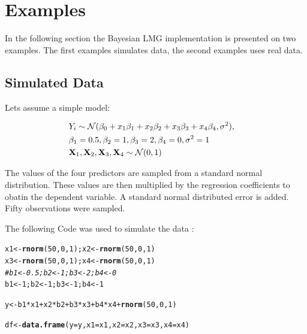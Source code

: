 \documentclass[11pt,a4paper,twoside]{book}\usepackage[]{graphicx}\usepackage[]{color}
\makeatletter
\newcommand{\hlnum}[1]{\textcolor[rgb]{0.686,0.059,0.569}{#1}}%
\newcommand{\hlcom}[1]{\textcolor[rgb]{0.678,0.584,0.686}{\textit{#1}}}%
\newcommand{\hlopt}[1]{\textcolor[rgb]{0,0,0}{#1}}%
\newcommand{\hlstd}[1]{\textcolor[rgb]{0.345,0.345,0.345}{#1}}%
\newcommand{\hlkwb}[1]{\textcolor[rgb]{0.69,0.353,0.396}{#1}}%
\newcommand{\hlkwc}[1]{\textcolor[rgb]{0.333,0.667,0.333}{#1}}%
\newcommand{\hlkwd}[1]{\textcolor[rgb]{0.737,0.353,0.396}{\textbf{#1}}}%
\newenvironment{kframe}{%
 \def\at@end@of@kframe{}%
 \ifinner\ifhmode%
  \def\at@end@of@kframe{\end{minipage}}%
  \begin{minipage}{\columnwidth}%
 \fi\fi%
 \def\FrameCommand##1{\hskip\@totalleftmargin \hskip-\fboxsep
 \colorbox{shadecolor}{##1}\hskip-\fboxsep
     \hskip-\linewidth \hskip-\@totalleftmargin \hskip\columnwidth}%
 \MakeFramed {\advance\hsize-\width
   \@totalleftmargin\z@ \linewidth\hsize
   \@setminipage}}%
 {\par\unskip\endMakeFramed%
 \at@end@of@kframe}
\newenvironment{knitrout}{}{} %
\makeatother
\begin{document}
\chapter{Examples}

In the following section the Bayesian LMG implementation is presented on two examples. The first examples simulates data, the second examples uses real data.

\section{Simulated Data}

Lets assume a simple model: 

\begin{align} 
&Y_{i} \sim \mathcal{N}(\beta_{0}+x_{1} \beta_{1}+x_{2} \beta_{2}+x_{3} \beta_{3}+x_{4} \beta_{4}, \sigma^2),& \\ & \beta_{1} = 0.5, \beta_{2} = 1,  \beta_{3} = 2 , \beta_{4}=0, \sigma^2 = 1 & \\ & {\mathbf{X}}_{1}, {\mathbf{X}}_{2},{\mathbf{X}}_{3},{\mathbf{X}}_{4} \sim \mathcal{N}(0, 1)&
\end{align} 


The values of the four predictors are sampled from a standard normal distribution. These values are then multiplied by the regression coefficients to obatin the dependent variable. A standard normal distributed error is added. Fifty observations were sampled.

The following Code was used to simulate the data :

\begin{knitrout}
\color{fgcolor}\begin{kframe}
\begin{alltt}
\hlstd{x1} \hlkwb{<-} \hlkwd{rnorm}\hlstd{(}\hlnum{50}\hlstd{,} \hlnum{0}\hlstd{,} \hlnum{1}\hlstd{); x2} \hlkwb{<-} \hlkwd{rnorm}\hlstd{(}\hlnum{50}\hlstd{,} \hlnum{0}\hlstd{,} \hlnum{1}\hlstd{)}
\hlstd{x3} \hlkwb{<-} \hlkwd{rnorm}\hlstd{(}\hlnum{50}\hlstd{,} \hlnum{0}\hlstd{,} \hlnum{1}\hlstd{); x4} \hlkwb{<-} \hlkwd{rnorm}\hlstd{(}\hlnum{50}\hlstd{,} \hlnum{0}\hlstd{,} \hlnum{1}\hlstd{)}
\hlcom{#b1 <- 0.5; b2 <- 1; b3 <- 2; b4 <- 0}
\hlstd{b1} \hlkwb{<-} \hlnum{1}\hlstd{; b2} \hlkwb{<-} \hlnum{1}\hlstd{; b3} \hlkwb{<-} \hlnum{1}\hlstd{; b4} \hlkwb{<-} \hlnum{1}

\hlstd{y} \hlkwb{<-} \hlstd{b1}\hlopt{*}\hlstd{x1} \hlopt{+} \hlstd{x2}\hlopt{*}\hlstd{b2} \hlopt{+} \hlstd{b3}\hlopt{*}\hlstd{x3} \hlopt{+} \hlstd{b4}\hlopt{*}\hlstd{x4} \hlopt{+} \hlkwd{rnorm}\hlstd{(}\hlnum{50}\hlstd{,} \hlnum{0}\hlstd{,} \hlnum{1}\hlstd{)}

\hlstd{df} \hlkwb{<-} \hlkwd{data.frame}\hlstd{(}\hlkwc{y} \hlstd{= y,} \hlkwc{x1} \hlstd{= x1,} \hlkwc{x2} \hlstd{= x2,} \hlkwc{x3} \hlstd{= x3,} \hlkwc{x4} \hlstd{= x4)}
\end{alltt}
\end{kframe}
\end{knitrout}
\end{document}
